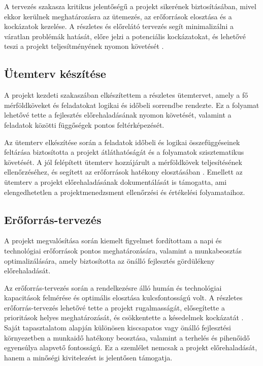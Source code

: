 A tervezés szakasza kritikus jelentőségű a projekt sikerének biztosításában, mivel ekkor kerülnek meghatározásra az ütemezés, az erőforrások elosztása és a kockázatok kezelése. 
A részletes és előrelátó tervezés segít minimalizálni a váratlan problémák hatását, előre jelzi a potenciális kockázatokat, 
és lehetővé teszi a projekt teljesítményének nyomon követését \cite{Hajdu2014,Szalay2018,Kovacs2016,Kaposi2019}.

\subsection{Ütemterv készítése}

A projekt kezdeti szakaszában elkészítettem a részletes ütemtervet, amely a fő mérföldköveket és feladatokat logikai és időbeli sorrendbe rendezte.  
Ez a folyamat lehetővé tette a fejlesztés előrehaladásának nyomon követését, valamint a feladatok közötti függőségek pontos feltérképezését.  

Az ütemterv elkészítése során a feladatok időbeli és logikai összefüggéseinek feltárása biztosította a projekt átláthatóságát és a folyamatok szisztematikus követését.  
A jól felépített ütemterv hozzájárult a mérföldkövek teljesítésének ellenőrzéséhez,  
és segített az erőforrások hatékony elosztásában \cite{Kovacs2016,Kaposi2019}.  
Emellett az ütemterv a projekt előrehaladásának dokumentálását is támogatta,  
ami elengedhetetlen a projektmenedzsment ellenőrzési és értékelési folyamataihoz.

\subsection{Erőforrás-tervezés}

A projekt megvalósítása során kiemelt figyelmet fordítottam a napi és technológiai erőforrások pontos meghatározására, valamint a munkabeosztás optimalizálására, 
amely biztosította az önálló fejlesztés gördülékeny előrehaladását.  

Az erőforrás-tervezés során a rendelkezésre álló humán és technológiai kapacitások felmérése és optimális elosztása kulcsfontosságú volt.  
A részletes erőforrás-tervezés lehetővé tette a projekt rugalmasságát, elősegítette a prioritások helyes meghatározását, és csökkentette a késedelmek kockázatát \cite{Hajdu2014,Szalay2018}.  
Saját tapasztalatom alapján különösen kiscsapatos vagy önálló fejlesztési környezetben a munkaidő hatékony beosztása, valamint a terhelés és pihenőidő egyensúlya alapvető fontosságú.  
Ez a szemlélet nemcsak a projekt előrehaladását, hanem a minőségi kivitelezést is jelentősen támogatja.

